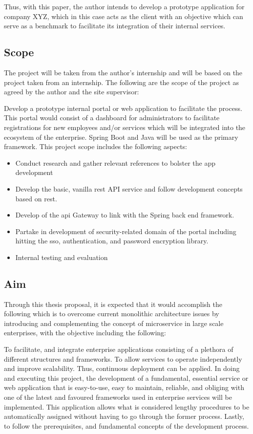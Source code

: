 \documentclass[conference, a4paper]{IEEEtran}
\begin{document}
Thus, with this paper, the author intends to develop a prototype application for company XYZ, which in this case acts as the client with an objective which can serve as a benchmark to facilitate its integration of their internal services. 

\subsection{Scope}
\label{sec:sub:title}
The project will be taken from the author’s internship and will be based on the project taken from an internship. The following are the scope of the project as agreed by the author and the site supervisor: 

Develop a prototype internal portal or web application to facilitate the process. This portal would consist of a dashboard for administrators to facilitate registrations for new employees and/or services which will be integrated into the ecosystem of the enterprise. Spring Boot and Java will be used as the primary framework. This project scope includes the following aspects: 

\begin{itemize}
    \item Conduct research and gather relevant references to bolster the app development
    \item Develop the basic, vanilla \gls{rest} \gls{API} service and follow development concepts based on \gls{rest}.
    \item Develop of the \gls{api} Gateway to link with the Spring back end framework.
    \item Partake in development of security-related domain of the portal including hitting the \gls{sso}, authentication, and password encryption library.
    \item Internal testing and evaluation
    
\end{itemize}

\subsection{Aim}
\label{sec:sub:title}
Through this thesis proposal, it is expected that it would accomplish the following which is to overcome current monolithic architecture issues by introducing and complementing the concept of microservice in large scale enterprises, with the objective including the following: 

To facilitate, and integrate enterprise applications consisting of a plethora of different structures and frameworks. 
To allow services to operate independently and improve scalability. 
Thus, continuous deployment can be applied. In doing and executing this project, the development of a fundamental, essential service or web application that is easy-to-use, easy to maintain, reliable, and obliging with one of the latest and favoured frameworks used in enterprise services will be implemented. 
This application allows what is considered lengthy procedures to be automatically assigned without having to go through the former process. Lastly, to follow the prerequisites, and fundamental concepts of the development process. 
\end{document}
